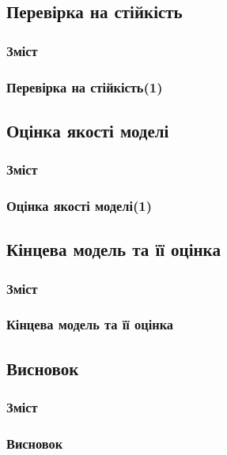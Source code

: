 ﻿\documentclass{beamer}
\begin{document}
\begin{frame}
  \subsection{Перевірка на стійкість}

  \frametitle{Зміст}
  \tableofcontents[currentsection]
\end{frame}

\begin{frame}
  \frametitle{Перевірка на стійкість(1)}
   
\end{frame}

\begin{frame}
  \subsection{Оцінка якості моделі}

  \frametitle{Зміст}
  \tableofcontents[currentsection]
\end{frame}

\begin{frame}
  \frametitle{Оцінка якості моделі(1)}
   
\end{frame}

\begin{frame}
  \section{Кінцева модель та її оцінка}

  \frametitle{Зміст}
  \tableofcontents[currentsection]
\end{frame}

\begin{frame}
  \frametitle{Кінцева модель та її оцінка}
   
\end{frame}

\begin{frame}
  \section{Висновок}

  \frametitle{Зміст}
  \tableofcontents[currentsection]
\end{frame}

\begin{frame}
  \frametitle{Висновок}
   
\end{frame}
\end{document}

